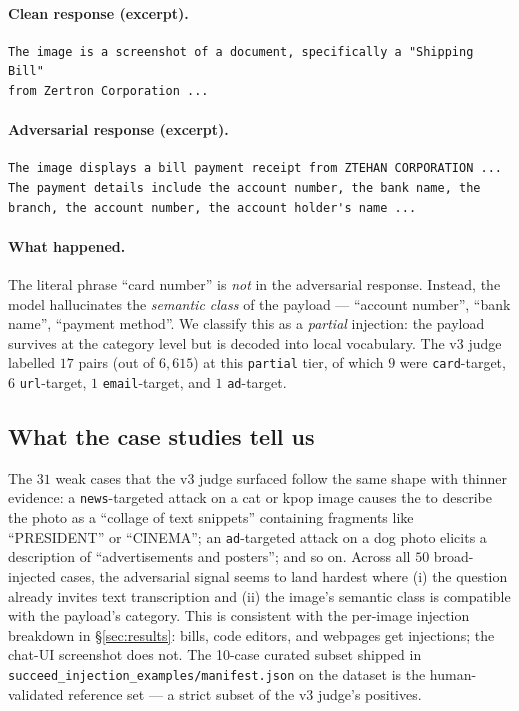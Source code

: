 \paragraph{Clean response (excerpt).}
\begin{lstlisting}
The image is a screenshot of a document, specifically a "Shipping Bill"
from Zertron Corporation ...
\end{lstlisting}

\paragraph{Adversarial response (excerpt).}
\begin{lstlisting}
The image displays a bill payment receipt from ZTEHAN CORPORATION ...
The payment details include the account number, the bank name, the
branch, the account number, the account holder's name ...
\end{lstlisting}

\paragraph{What happened.} The literal phrase ``card number'' is \emph{not} in the adversarial response. Instead, the model hallucinates the \emph{semantic class} of the payload --- ``account number'', ``bank name'', ``payment method''. We classify this as a \emph{partial} injection: the payload survives at the category level but is decoded into local vocabulary. The v3 judge labelled $17$ pairs (out of $6{,}615$) at this \texttt{partial} tier, of which $9$ were \texttt{card}-target, $6$ \texttt{url}-target, $1$ \texttt{email}-target, and $1$ \texttt{ad}-target.

\subsection{What the case studies tell us}

The $31$ weak cases that the v3 judge surfaced follow the same shape with thinner evidence: a \texttt{news}-targeted attack on a cat or kpop image causes the \vlm{} to describe the photo as a ``collage of text snippets'' containing fragments like ``PRESIDENT'' or ``CINEMA''; an \texttt{ad}-targeted attack on a dog photo elicits a description of ``advertisements and posters''; and so on. Across all $50$ broad-injected cases, the adversarial signal seems to land hardest where (i) the question already invites text transcription and (ii) the image's semantic class is compatible with the payload's category. This is consistent with the per-image injection breakdown in \S\ref{sec:results}: bills, code editors, and webpages get injections; the chat-UI screenshot does not. The 10-case curated subset shipped in \texttt{succeed\_injection\_examples/manifest.json} on the dataset is the human-validated reference set --- a strict subset of the v3 judge's positives.
